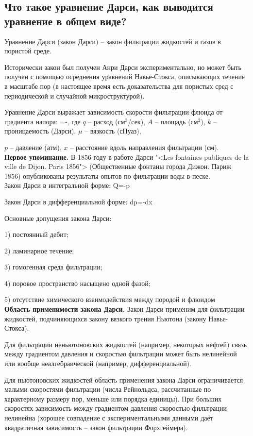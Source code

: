 

\subsection{Что такое уравнение Дарси, как выводится уравнение в общем виде?}

Уравнение Дарси (закон Дарси) -- закон фильтрации жидкостей и газов в пористой среде.

Исторически закон был получен Анри Дарси экспериментально, но может быть получен с помощью осреднения уравнений Навье-Стокса, описывающих течение в масштабе пор (в настоящее время есть доказательства для пористых сред с периодической и случайной микроструктурой).

Уравнение Дарси выражает зависимость скорости фильтрации флюида от градиента напора:
\beq
{}=-,
\eeq
где $q$ -- расход (см$^3$/сек), $A$ -- площадь (см$^2$), $k$ -- проницаемость (Дарси), $\mu$ -- вязкость (сПуаз),

$p$ -- давление (атм), $x$ -- расстояние вдоль направления фильтрации (см).
\\

\textbf{Первое упоминание.}
В 1856 году в работе Дарси "<Les fontaines publiques de la ville de Dijon. Paris 1856"> (Общественные фонтаны города Дижон. Париж 1856) опубликованы результаты опытов по фильтрации воды в песке.
\\

Закон Дарси в интегральной форме:
\beq
Q=-\Delta p
\eeq

Закон Дарси в дифференциальной форме:
\beq\label{DiffDarcyExam}
dp=-dx
\eeq

Основные допущения закона Дарси:

1) постоянный дебит;

2) ламинарное течение;

3) гомогенная среда фильтрации;

4) поровое пространство насыщено одной фазой;

5) отсутствие химического взаимодействия между породой и флюидом
\\

\textbf{Область применимости закона Дарси.}
Закон Дарси применим для фильтрации жидкостей, подчиняющихся закону вязкого трения Ньютона (закону Навье-Стокса).

Для фильтрации неньютоновских жидкостей (например, некоторых нефтей) связь между градиентом давления и скоростью фильтрации может быть нелинейной или вообще неалгебраической (например, дифференциальной).

Для ньютоновских жидкостей область применения закона Дарси ограничивается малыми скоростями фильтрации (числа Рейнольдса, рассчитанные по характерному размеру пор, меньше или порядка единицы).
При больших скоростях зависимость между градиентом давления скоростью фильтрации нелинейна (хорошее совпадение с экспериментальными данными даёт квадратичная зависимость -- закон фильтрации Форхгеймера).

